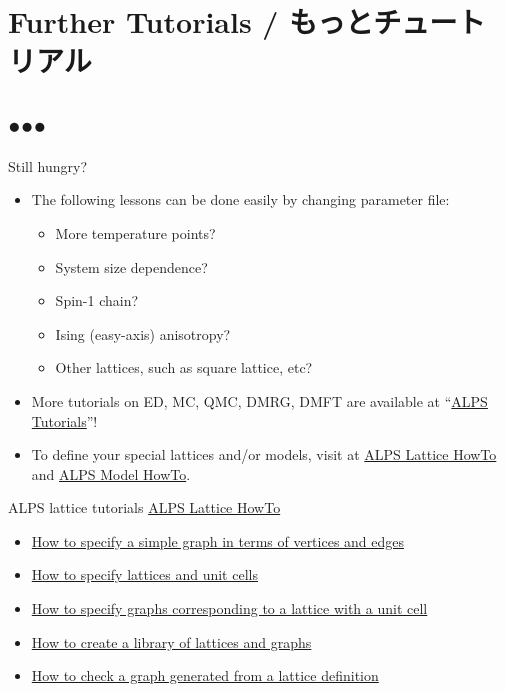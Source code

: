 \section{Further Tutorials / もっとチュートリアル}
\subsection*{{\protect\color{red}●}{\protect\color{blue}●}{\protect\color{green}●}}

\begin{frame}[t,fragile]{Still hungry?}
  \begin{itemize}
  \item The following lessons can be done easily by changing parameter file:
    \begin{itemize}
    \item More temperature points?
    \item System size dependence?
    \item Spin-1 chain?
    \item Ising (easy-axis) anisotropy?
    \item Other lattices, such as square lattice, etc?
    \end{itemize}
  \item More tutorials on ED, MC, QMC, DMRG, DMFT are available at ``\href{http://alps.comp-phys.org/mediawiki/index.php/ALPS_2_Tutorials:Overview}{ALPS Tutorials}''!
  \item To define your special lattices and/or models, visit at \href{http://alps.comp-phys.org/mediawiki/index.php/Tutorials:LatticeHOWTO}{ALPS Lattice HowTo} and \href{http://alps.comp-phys.org/mediawiki/index.php/Tutorials:ModelHOWTO}{ALPS Model HowTo}.
  \end{itemize}
\end{frame}

\begin{frame}[t,fragile]{ALPS lattice tutorials}
  \href{http://alps.comp-phys.org/mediawiki/index.php/Tutorials:LatticeHOWTO}{ALPS Lattice HowTo} \\
  \begin{itemize}
    \item \href{http://alps.comp-phys.org/mediawiki/index.php/Tutorials:LatticeHOWTO:SimpleGraphs}{How to specify a simple graph in terms of vertices and edges}
    \item \href{http://alps.comp-phys.org/mediawiki/index.php/Tutorials:LatticesAndUnitCells}{How to specify lattices and unit cells}
    \item \href{http://alps.comp-phys.org/mediawiki/index.php/Tutorials:LatticesAndGraphs}{How to specify graphs corresponding to a lattice with a unit cell}
    \item \href{http://alps.comp-phys.org/mediawiki/index.php/Tutorials:LatticeHOWTO:Library}{How to create a library of lattices and graphs}
    \item \href{http://alps.comp-phys.org/mediawiki/index.php/Tutorials:LatticeHowto:CheckLattice}{How to check a graph generated from a lattice definition}
  \end{itemize}
\end{frame}

